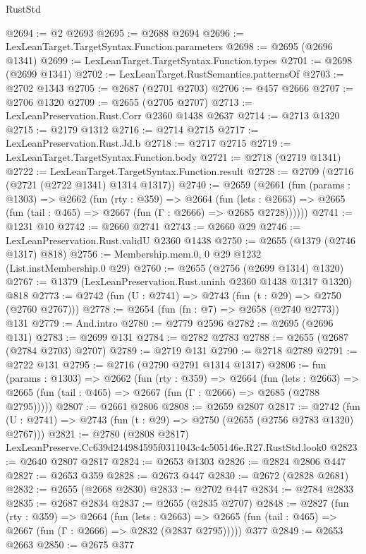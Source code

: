 \begin{lexlean}{RustStd}
\begin{coremodule}
@2694 := @2 @2693
@2695 := @2688 @2694
@2696 := LexLeanTarget.TargetSyntax.Function.parameters
@2698 := @2695 (@2696 @1341)
@2699 := LexLeanTarget.TargetSyntax.Function.types
@2701 := @2698 (@2699 @1341)
@2702 := LexLeanTarget.RustSemantics.patternsOf
@2703 := @2702 @1343
@2705 := @2687 (@2701 @2703)
@2706 := @457 @2666
@2707 := @2706 @1320
@2709 := @2655 (@2705 @2707)
@2713 := LexLeanPreservation.Rust.Corr @2360 @1438 @2637
@2714 := @2713 @1320
@2715 := @2179 @1312
@2716 := @2714 @2715
@2717 := LexLeanPreservation.Rust.Jd.b
@2718 := @2717 @2715
@2719 := LexLeanTarget.TargetSyntax.Function.body
@2721 := @2718 (@2719 @1341)
@2722 := LexLeanTarget.TargetSyntax.Function.result
@2728 := @2709 (@2716 (@2721 (@2722 @1341) @1314 @1317))
@2740 := @2659
    (@2661
      (fun (params : @1303) =>
      @2662
        (fun (rty : @359) =>
        @2664
          (fun (lets : @2663) =>
          @2665 (fun (tail : @465) => @2667 (fun (Γ : @2666) => @2685 @2728))))))
@2741 := @1231 @10
@2742 := @2660 @2741
@2743 := @2660 @29
@2746 := LexLeanPreservation.Rust.validU @2360 @1438
@2750 := @2655 (@1379 (@2746 @1317) @818)
@2756 := Membership.mem.{0, 0} @29 @1232 (List.instMembership.{0} @29)
@2760 := @2655 (@2756 (@2699 @1314) @1320)
@2767 := @1379 (LexLeanPreservation.Rust.uninh @2360 @1438 @1317 @1320) @818
@2773 := @2742 (fun (U : @2741) => @2743 (fun (t : @29) => @2750 (@2760 @2767)))
@2778 := @2654 (fun (fn : @7) => @2658 (@2740 @2773)) @131
@2779 := And.intro
@2780 := @2779 @2596
@2782 := @2695 (@2696 @131)
@2783 := @2699 @131
@2784 := @2782 @2783
@2788 := @2655 (@2687 (@2784 @2703) @2707)
@2789 := @2719 @131
@2790 := @2718 @2789
@2791 := @2722 @131
@2795 := @2716 (@2790 @2791 @1314 @1317)
@2806 := fun (params : @1303) =>
  @2662
    (fun (rty : @359) =>
    @2664
      (fun (lets : @2663) =>
      @2665 (fun (tail : @465) => @2667 (fun (Γ : @2666) => @2685 (@2788 @2795)))))
@2807 := @2661 @2806
@2808 := @2659 @2807
@2817 := @2742 (fun (U : @2741) => @2743 (fun (t : @29) => @2750 (@2655 (@2756 @2783 @1320) @2767)))
@2821 := @2780 (@2808 @2817) LexLeanPreserve.Cc639d244984595f0311043c4c505146e.R27.RustStd.look0
@2823 := @2640 @2807 @2817
@2824 := @2653 @1303
@2826 := @2824 @2806 @447
@2827 := @2653 @359
@2828 := @2673 @447
@2830 := @2672 (@2828 @2681)
@2832 := @2655 (@2668 @2830)
@2833 := @2702 @447
@2834 := @2784 @2833
@2835 := @2687 @2834
@2837 := @2655 (@2835 @2707)
@2848 := @2827
    (fun (rty : @359) =>
    @2664
      (fun (lets : @2663) =>
      @2665 (fun (tail : @465) => @2667 (fun (Γ : @2666) => @2832 (@2837 @2795)))))
    @377
@2849 := @2653 @2663
@2850 := @2675 @377

\end{coremodule}
\end{lexlean}
